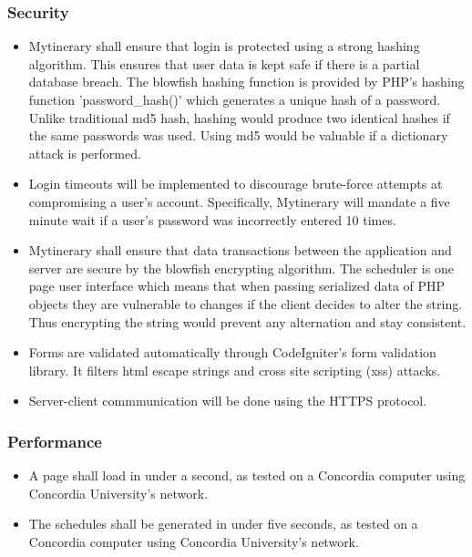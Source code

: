 \documentclass[12pt]{article}
\begin{document}
\subsubsection*{Security}
\begin{itemize}
    \item  Mytinerary shall ensure that login is protected using a strong hashing algorithm. This ensures that user data is kept safe if there is a partial database breach. The blowfish hashing function is provided by PHP’s hashing function 'password\_hash()' which generates a unique hash of a password. Unlike traditional md5 hash, hashing would produce two identical hashes if the same passwords was used. Using md5 would be valuable if a dictionary attack is performed.
    \item Login timeouts will be implemented to discourage brute-force attempts at compromising a user's account. Specifically, Mytinerary will mandate a five minute wait if a user's password was incorrectly entered 10 times.
    \item  Mytinerary shall ensure that data transactions between the application and server are secure by the blowfish encrypting algorithm. The scheduler is one page user interface which means that when passing serialized data of PHP objects they are vulnerable to changes if the client decides to alter the string. Thus encrypting the string would prevent any alternation and stay consistent.
    \item  Forms are validated automatically through CodeIgniter’s form validation library. It filters html escape strings and cross site scripting (xss) attacks.
    \item Server-client commmunication will be done using the HTTPS protocol.
\end{itemize}

\subsubsection*{Performance}
\begin{itemize}
    \item A page shall load in under a second, as tested on a Concordia computer using Concordia University's network.
    \item The schedules shall be generated in under five seconds, as tested on a Concordia computer using Concordia University's network.
\end{itemize}
\end{document}
